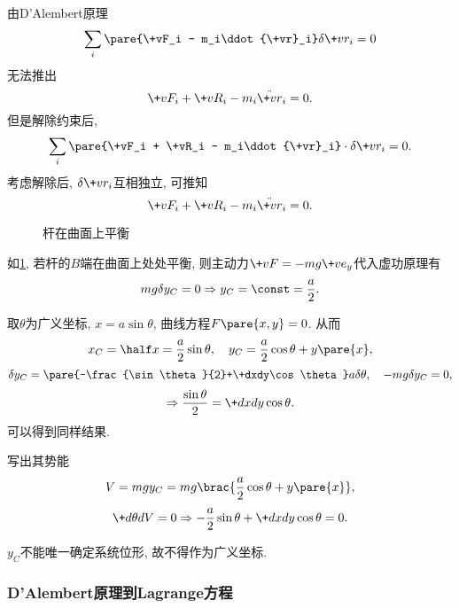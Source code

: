 \documentclass[../LectureNotes.tex]{subfiles}
\begin{document}
\begin{remark}
    由D'Alembert原理
    \[ \sum_i \pare{\+vF_i - m_i\ddot{\+vr}_i}\delta \+vr_i = 0 \]
    无法推出
    \[ \+vF_i + \+vR_i - m_i\ddot{\+vr}_i = 0. \]
    但是解除约束后,
    \[ \sum_i \pare{\+vF_i + \+vR_i - m_i\ddot{\+vr}_i}\cdot\delta\+vr_i = 0. \]
    考虑解除后, $\delta \+vr_i$互相独立, 可推知
    \[ \+vF_i + \+vR_i - m_i\ddot{\+vr}_i = 0. \]
\end{remark}

\begin{figure}[ht]
    \centering
    \caption{杆在曲面上平衡}
    \label{fig:杆在曲面上平衡}
\end{figure}
\begin{sample}
    \begin{ex}
        如\cref{fig:杆在曲面上平衡}, 若杆的$B$端在曲面上处处平衡, 则主动力$\+vF = -mg\+ve_y$代入虚功原理有
        \[ mg\delta y_C = 0 \Rightarrow y_C = \const = \frac{a}{2}. \]
    \end{ex}
    \begin{ex}
        取$\theta$为广义坐标, $x = a\sin\theta$, 曲线方程$F\pare{x,y} = 0$. 从而
        \[ x_C = \half x = \frac{a}{2}\sin\theta,\quad y_C = \frac{a}{2}\cos\theta + y\pare{x}, \]
        \[ \delta y_C = \pare{-\frac{\sin\theta}{2}+\+dxdy\cos\theta}a\delta\theta,\quad -mg\delta y_C = 0, \]
        \[ \Rightarrow \frac{\sin\theta}{2} = \+dxdy \cos\theta. \]
        可以得到同样结果.
    \end{ex}
    \begin{ex}
        写出其势能
        \[ V = mgy_C = mg\brac{\frac{a}{2}\cos\theta + y\pare{x}}, \]
        \[ \+d\theta dV = 0\Rightarrow -\frac{a}{2}\sin\theta + \+dxdy\cos\theta = 0. \]
    \end{ex}
\end{sample}
\begin{remark}
    $y_C$不能唯一确定系统位形, 故不得作为广义坐标.
\end{remark}


\subsubsection{D'Alembert原理到Lagrange方程} %
\label{ssub:d_alembert原理到lagrange方程}
\end{document}
